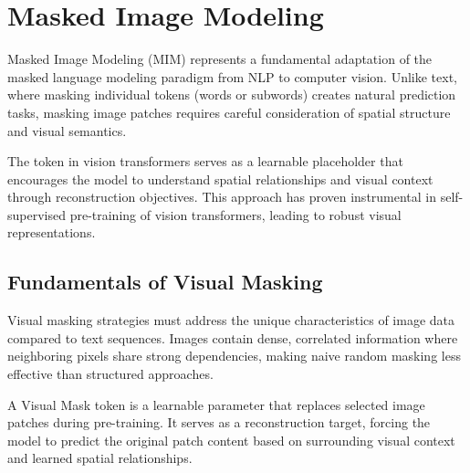 
\section{Masked Image Modeling}

Masked Image Modeling (MIM) represents a fundamental adaptation of the masked language modeling paradigm from NLP to computer vision. Unlike text, where masking individual tokens (words or subwords) creates natural prediction tasks, masking image patches requires careful consideration of spatial structure and visual semantics.
\begin{comment}
Feedback: This is a good introduction. To make the core challenge clearer, you could add: "The central challenge of MIM is that image data is dense and spatially continuous, unlike the sparse, discrete nature of text. A missing word in a sentence has a clear semantic gap, but a missing patch in an image can often be easily 'cheated' by interpolating from its immediate neighbors. Therefore, effective visual masking strategies must be designed to create a genuinely difficult and meaningful reconstruction task for the model."
\end{comment}

The \mask{} token in vision transformers serves as a learnable placeholder that encourages the model to understand spatial relationships and visual context through reconstruction objectives. This approach has proven instrumental in self-supervised pre-training of vision transformers, leading to robust visual representations.

\subsection{Fundamentals of Visual Masking}

Visual masking strategies must address the unique characteristics of image data compared to text sequences. Images contain dense, correlated information where neighboring pixels share strong dependencies, making naive random masking less effective than structured approaches.

\begin{definition}
A Visual Mask token is a learnable parameter that replaces selected image patches during pre-training. It serves as a reconstruction target, forcing the model to predict the original patch content based on surrounding visual context and learned spatial relationships.
\end{definition}

